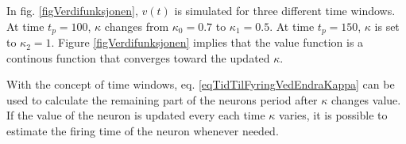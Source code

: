 
%



In fig. \ref{figVerdifunksjonen}, $v(t)$ is simulated for three different time windows. 
At time $t_p=100$, $\kappa$ changes from $\kappa_0=0.7$ to $\kappa_1=0.5$. 
At time $t_p=150$, $\kappa$ is set to $\kappa_2=1$. 
Figure \ref{figVerdifunksjonen} implies that the value function is a continous function that converges toward the updated $\kappa$. %


With the concept of time windows, eq. \eqref{eqTidTilFyringVedEndraKappa} can be used to calculate the remaining part of the neurons period after $\kappa$ changes value. 
If the value of the neuron is updated every each time $\kappa$ varies, it is possible to estimate the firing time of the neuron whenever needed. %

